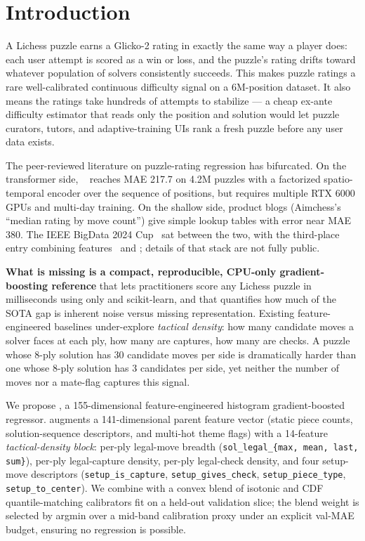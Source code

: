 \section{Introduction}
\label{sec:intro}

A Lichess puzzle earns a Glicko-2 rating in exactly the same way a player does: each user attempt is scored as a win or loss, and the puzzle's rating drifts toward whatever population of solvers consistently succeeds. This makes puzzle ratings a rare well-calibrated continuous difficulty signal on a 6M-position dataset. It also means the ratings take hundreds of attempts to stabilize --- a cheap ex-ante difficulty estimator that reads only the position and solution would let puzzle curators, tutors, and adaptive-training UIs rank a fresh puzzle before any user data exists.

The peer-reviewed literature on puzzle-rating regression has bifurcated. On the transformer side, \glickformer~\citep{milosz2024glickformer} reaches MAE 217.7 on 4.2M puzzles with a factorized spatio-temporal encoder over the sequence of positions, but requires multiple RTX 6000 GPUs and multi-day training. On the shallow side, product blogs (\eg Aimchess's ``median rating by move count'') give simple lookup tables with error near MAE 380. The IEEE BigData 2024 Cup~\citep{ieee2024cup} sat between the two, with the third-place entry combining \maia features~\citep{mcilroy2020aligning} and \lightgbm; details of that stack are not fully public.

{\bf What is missing is a compact, reproducible, CPU-only gradient-boosting reference} that lets practitioners score any Lichess puzzle in milliseconds using only \pychess and scikit-learn, and that quantifies how much of the SOTA gap is inherent noise versus missing representation. Existing feature-engineered baselines under-explore \emph{tactical density}: how many candidate moves a solver faces at each ply, how many are captures, how many are checks. A puzzle whose 8-ply solution has 30 candidate moves per side is dramatically harder than one whose 8-ply solution has 3 candidates per side, yet neither the number of moves nor a mate-flag captures this signal.

We propose \ours, a 155-dimensional feature-engineered histogram gradient-boosted regressor. \ours augments a 141-dimensional parent feature vector (static piece counts, solution-sequence descriptors, and multi-hot theme flags) with a 14-feature \emph{tactical-density block}: per-ply legal-move breadth (\texttt{sol\_legal\_\{max, mean, last, sum\}}), per-ply legal-capture density, per-ply legal-check density, and four setup-move descriptors (\texttt{setup\_is\_capture}, \texttt{setup\_gives\_check}, \texttt{setup\_piece\_type}, \texttt{setup\_to\_center}). We combine \ours with a convex blend of isotonic and CDF quantile-matching calibrators fit on a held-out validation slice; the blend weight is selected by argmin over a mid-band calibration proxy under an explicit val-MAE budget, ensuring no regression is possible.

